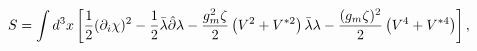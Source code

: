 \begin{equation}
S=\int
d^3x\left[\frac12(\partial_i\chi)^2-\frac{1}{2}\bar\lambda\hat\partial\lambda-
{g_m^2\zeta\over 2} \left(V^2+V^{*2}\right)\bar\lambda\lambda-
{(g_m\zeta)^2\over 2}\left(V^4+V^{*4}\right)\right],
\label{action}\end{equation}

